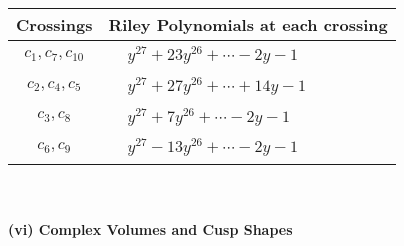 \documentclass[1p]{elsarticle_modified}
\theoremstyle{definition}
\begin{document}
\begin{tabular}{m{50pt}|m{274pt}}
Crossings & \hspace{64pt}Riley Polynomials at each crossing \\
\hline $$\begin{aligned}c_{1},c_{7},c_{10}\end{aligned}$$&$\begin{aligned}
&y^{27}+23 y^{26}+\cdots-2 y-1
\end{aligned}$\\
\hline $$\begin{aligned}c_{2},c_{4},c_{5}\end{aligned}$$&$\begin{aligned}
&y^{27}+27 y^{26}+\cdots+14 y-1
\end{aligned}$\\
\hline $$\begin{aligned}c_{3},c_{8}\end{aligned}$$&$\begin{aligned}
&y^{27}+7 y^{26}+\cdots-2 y-1
\end{aligned}$\\
\hline $$\begin{aligned}c_{6},c_{9}\end{aligned}$$&$\begin{aligned}
&y^{27}-13 y^{26}+\cdots-2 y-1
\end{aligned}$\\
\hline
\end{tabular}\\~\\
\newpage\flushleft \textbf{(vi) Complex Volumes and Cusp Shapes}
\end{document}
